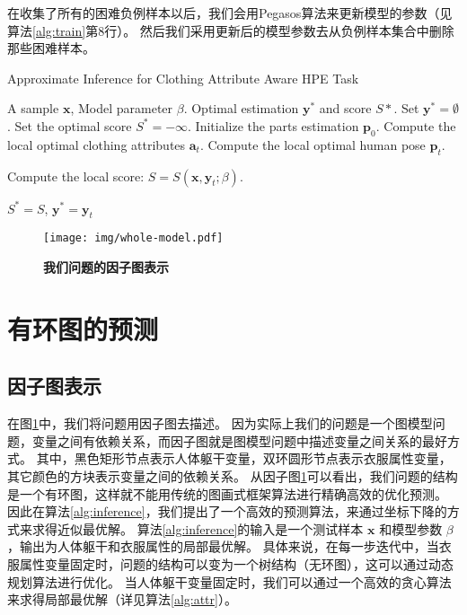 在收集了所有的困难负例样本以后，我们会用Pegasos算法\cite{pegasos}来更新模型的参数（见算法\ref{alg:train}第8行）。
然后我们采用更新后的模型参数去从负例样本集合中删除那些困难样本。


\begin{algorithm}
\caption{Approximate Inference for Clothing Attribute Aware HPE Task}
\begin{algorithmic}[1]
    \REQUIRE A sample $\mathbf{x}$, Model parameter $\beta$.
    \ENSURE Optimal estimation $\mathbf{y}^*$ and score $S*$.
    \STATE Set $\mathbf{y}^* = \emptyset$.
    \STATE Set the optimal score $S^* = -\infty$.
    \STATE Initialize the parts estimation $\mathbf{p}_0$.
    \REPEAT
        \STATE Compute the local optimal clothing attributes $\mathbf{a}_t$.
        \STATE Compute the local optimal human pose $\mathbf{p}_t$.

        \STATE Compute the local score: $S = S(\mathbf{x}, \mathbf{y}_t; \beta)$.

            \STATE $S^* = S$, $\mathbf{y}^* = \mathbf{y}_t $
        \ENDIF
\end{algorithmic}
\label{alg:inference}
\end{algorithm}


\begin{figure}[tbp]
\centering
\texttt{[image: img/whole-model.pdf]}
\caption{ \textbf{我们问题的因子图表示} }
\label{fig:graph}
\end{figure}

\section{有环图的预测}
\label{subsec:inference}

\subsection{因子图表示}
在图\ref{fig:graph}中，我们将问题用因子图去描述。
因为实际上我们的问题是一个图模型问题，变量之间有依赖关系，而因子图就是图模型问题中描述变量之间关系的最好方式。
其中，黑色矩形节点表示人体躯干变量，双环圆形节点表示衣服属性变量，其它颜色的方块表示变量之间的依赖关系。
从因子图\ref{fig:graph}可以看出，我们问题的结构是一个有环图，这样就不能用传统的图画式框架算法进行精确高效的优化预测。
因此在算法\ref{alg:inference}，我们提出了一个高效的预测算法，来通过坐标下降的方式来求得近似最优解。
算法\ref{alg:inference}的输入是一个测试样本 $\mathbf{x}$ 和模型参数 $\beta$，输出为人体躯干和衣服属性的局部最优解。
具体来说，在每一步迭代中，当衣服属性变量固定时，问题的结构可以变为一个树结构（无环图），这可以通过动态规划算法\cite{ps2}进行优化。
当人体躯干变量固定时，我们可以通过一个高效的贪心算法来求得局部最优解（详见算法\ref{alg:attr}）。

